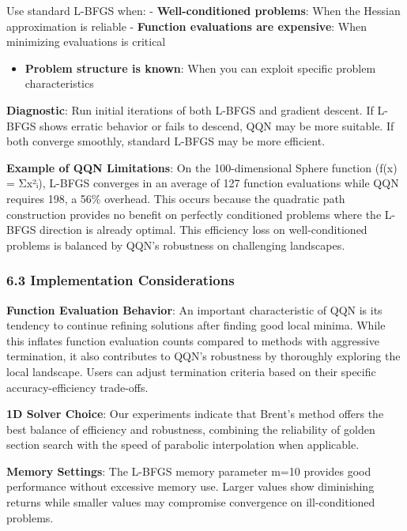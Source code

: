 Use standard L-BFGS when:
- \textbf{Well-conditioned problems}: When the Hessian approximation is reliable
- \textbf{Function evaluations are expensive}: When minimizing evaluations is critical

\begin{itemize}
\tightlist
\item
  \textbf{Problem structure is known}: When you can exploit specific problem characteristics
\end{itemize}

\textbf{Diagnostic}: Run initial iterations of both L-BFGS and gradient descent. If L-BFGS shows
erratic behavior or fails to descend, QQN may be more suitable. If both converge smoothly,
standard L-BFGS may be more efficient.

\textbf{Example of QQN Limitations}: On the 100-dimensional Sphere function (f(x) = Σx²ᵢ), L-BFGS converges in
an average of 127 function evaluations while QQN requires 198, a 56\% overhead. This occurs because the quadratic
path construction provides no benefit on perfectly conditioned problems where the L-BFGS direction is already optimal.
This efficiency loss on well-conditioned problems is balanced by QQN's robustness on challenging landscapes.

\hypertarget{implementation-considerations}{%
\subsubsection{6.3 Implementation Considerations}\label{implementation-considerations}}

\textbf{Function Evaluation Behavior}: An important characteristic of QQN is its tendency to continue refining solutions
after finding good local minima. While this inflates function evaluation counts compared to methods with aggressive
termination, it also contributes to QQN's robustness by thoroughly exploring the local landscape. Users can adjust
termination criteria based on their specific accuracy-efficiency trade-offs.

\textbf{1D Solver Choice}: Our experiments indicate that Brent's method offers the best balance of efficiency and robustness,
combining the reliability of golden section search with the speed of parabolic interpolation when applicable.

\textbf{Memory Settings}: The L-BFGS memory parameter m=10 provides good performance without excessive memory use. Larger
values show diminishing returns while smaller values may compromise convergence on ill-conditioned problems.

